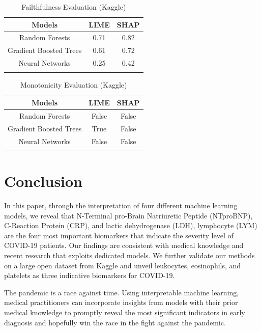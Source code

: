 \begin{table}[H]
\centering
\caption{Failthfulness Evaluation (Kaggle)}
\begin{tabular}{@{}ccc@{}}
\toprule
Models   & LIME & SHAP \\ \midrule
Random Forests & 0.71  & 0.82      \\
Gradient Boosted Trees & 0.61 & 0.72 \\
Neural Networks & 0.25 & 0.42 \\ \bottomrule
\label{kaggle_faith}
\end{tabular}
\end{table}

\begin{table}[H]
\centering
\caption{Monotonicity Evaluation (Kaggle)}
\begin{tabular}{@{}ccc@{}}
\toprule
Models   & LIME & SHAP \\ \midrule
Random Forests & False  & False      \\
Gradient Boosted Trees & True & False \\
Neural Networks & False & False \\ \bottomrule
\label{kaggle_mono}
\end{tabular}
\end{table}

\section{Conclusion}

In this paper, through the interpretation of four different machine learning models, we reveal that N-Terminal pro-Brain Natriuretic Peptide (NTproBNP), C-Reaction Protein (CRP), and lactic dehydrogenase (LDH), lymphocyte (LYM) are the four most important biomarkers that indicate the severity level of COVID-19 patients. Our findings are consistent with medical knowledge and recent research that exploits dedicated models. We further validate our methods on a large open dataset from Kaggle and unveil leukocytes, eosinophils, and platelets as three indicative biomarkers for COVID-19.

The pandemic is a race against time. Using interpretable machine learning, medical practitioners can incorporate insights from models with their prior medical knowledge to promptly reveal the most significant indicators in early diagnosis and hopefully win the race in the fight against the pandemic.
\clearpage

